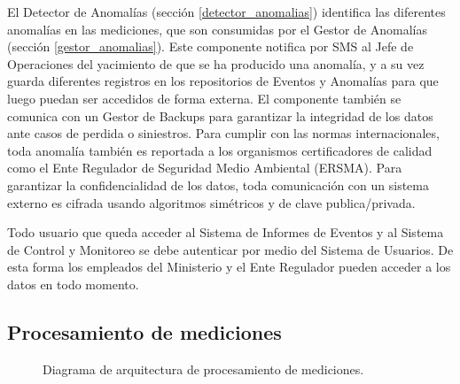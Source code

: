 \documentclass{article}
\theoremstyle{definition}
\theoremstyle{remark}
\begin{document}
El Detector de Anomalías (sección \ref{detector_anomalias}) identifica las diferentes anomalías en las mediciones, que son consumidas por el Gestor de Anomalías (sección \ref{gestor_anomalias}). Este componente notifica por SMS al Jefe de Operaciones del yacimiento de que se ha producido una anomalía, y a su vez guarda diferentes registros en los repositorios de Eventos y Anomalías para que luego puedan ser accedidos de forma externa. El componente también se comunica con un Gestor de Backups para garantizar la integridad de los datos ante casos de perdida o siniestros. Para cumplir con las normas internacionales, toda anomalía también es reportada a los organismos certificadores de calidad como el Ente Regulador de Seguridad Medio Ambiental (ERSMA). Para garantizar la confidencialidad de los datos, toda comunicación con un sistema externo es cifrada usando algoritmos simétricos y de clave publica/privada.

Todo usuario que queda acceder al Sistema de Informes de Eventos y al Sistema de Control y Monitoreo se debe autenticar por medio del Sistema de Usuarios. De esta forma los empleados del Ministerio y el Ente Regulador pueden acceder a los datos en todo momento.

\subsection{Procesamiento de mediciones}  \label{procesador_mediciones}

\begin{figure}[H]
  \caption{Diagrama de arquitectura de procesamiento de mediciones.}
\end{figure}
\end{document}
